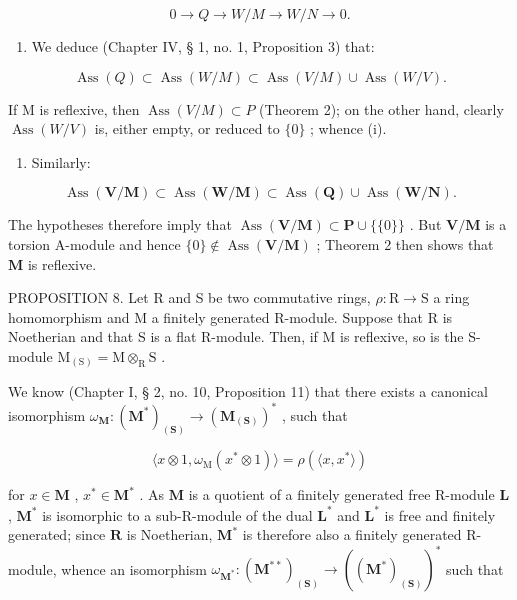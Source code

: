 \[
0 \rightarrow Q \rightarrow W / M \rightarrow W / N \rightarrow 0.
\]

\begin{enumerate}
\def\labelenumi{(\roman{enumi})}
\tightlist
\item
  We deduce (Chapter IV, § 1, no. 1, Proposition 3) that:
\end{enumerate}

\[
\operatorname{Ass} (Q) \subset \operatorname{Ass} (W / M) \subset \operatorname{Ass} (V / M) \cup \operatorname{Ass} (W / V).
\]

If M is reflexive, then \(\operatorname{Ass}(V/M) \subset P\) (Theorem 2); on the other hand, clearly \(\operatorname{Ass}(W/V)\) is, either empty, or reduced to \(\{0\}\) ; whence (i).

\begin{enumerate}
\def\labelenumi{(\roman{enumi})}
\setcounter{enumi}{1}
\tightlist
\item
  Similarly:
\end{enumerate}

\[
\operatorname{Ass} (\mathbf {V} / \mathbf {M}) \subset \operatorname{Ass} (\mathbf {W} / \mathbf {M}) \subset \operatorname{Ass} (\mathbf {Q}) \cup \operatorname{Ass} (\mathbf {W} / \mathbf {N}).
\]

The hypotheses therefore imply that \(\operatorname{Ass}(\mathbf{V} / \mathbf{M}) \subset \mathbf{P} \cup \{\{0\}\}\) . But \(\mathbf{V} / \mathbf{M}\) is a torsion A-module and hence \(\{0\} \notin \operatorname{Ass}(\mathbf{V} / \mathbf{M})\) ; Theorem 2 then shows that \(\mathbf{M}\) is reflexive.

PROPOSITION 8. Let R and S be two commutative rings, \(\rho: \mathrm{R} \to \mathrm{S}\) a ring homomorphism and M a finitely generated R-module. Suppose that R is Noetherian and that S is a flat R-module. Then, if M is reflexive, so is the S-module \(\mathrm{M}_{(\mathrm{S})} = \mathrm{M} \otimes_{\mathrm{R}} \mathrm{S}\) .

We know (Chapter I, § 2, no. 10, Proposition 11) that there exists a canonical isomorphism \(\omega_{\mathbf{M}}\colon (\mathbf{M}^{*})_{(\mathbf{S})}\to (\mathbf{M}_{(\mathbf{S})})^{*}\) , such that

\[
\langle x \otimes 1, \omega_ {\mathrm{M}} (x ^ {*} \otimes 1) \rangle = \rho (\langle x, x ^ {*} \rangle)
\]

for \(x \in \mathbf{M}\) , \(x^{*} \in \mathbf{M}^{*}\) . As \(\mathbf{M}\) is a quotient of a finitely generated free R-module \(\mathbf{L}\) , \(\mathbf{M}^{*}\) is isomorphic to a sub-R-module of the dual \(\mathbf{L}^{*}\) and \(\mathbf{L}^{*}\) is free and finitely generated; since \(\mathbf{R}\) is Noetherian, \(\mathbf{M}^{*}\) is therefore also a finitely generated R-module, whence an isomorphism \(\omega_{\mathbf{M}^{*}}: (\mathbf{M}^{**})_{(\mathbf{S})} \to ((\mathbf{M}^{*})_{(\mathbf{S})})^{*}\) such that


